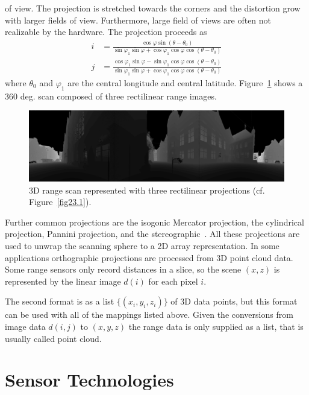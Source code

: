 \documentclass[twocolumn,oneside]{book}
\begin{document}
of view. The projection is stretched towards the corners and the
distortion grow with larger fields of view. Furthermore, large field
of views are often not realizable by the hardware. The projection
proceeds as
\begin{align*}
i &= \frac{\cos \varphi \sin \left( \theta - \theta_0 \right)}{\sin \varphi_1 \sin \varphi + \cos \varphi_1 
\cos \varphi \cos \left(\theta - \theta_0  \right)}
\\
j &= \frac{\cos \varphi_1 \sin \varphi - \sin \varphi_1 \cos \varphi  \cos \left(\theta - \theta_0 \right)}
{\sin \varphi_1 \sin \varphi + \cos \varphi_1\cos \varphi \cos \left(\theta - \theta_0  \right)}
\end{align*}
where $\theta_0$ and $\varphi_1$ are the central longitude and central
latitude. Figure~\ref{rectilinear} shows a 360 deg. scan composed of
three rectilinear range images.
%
\begin{figure}
  \includegraphics[width=\linewidth]{BOOKFIGS/scan007_RECTILINEAR_depth_1}
  \caption{3D range scan represented with three rectilinear
    projections (cf. Figure~\ref{fig23.1}).}
\label{rectilinear}
\end{figure}

Further common projections are the isogonic Mercator projection, the
cylindrical projection, Pannini projection, and the
stereographic~\cite{Houshiar2013}. All these projections are used to
unwrap the scanning sphere to a 2D array representation. In some
applications orthographic projections are processed from 3D point
cloud data. Some range sensors only record distances in a slice, so
the scene $(x,z)$ is represented by the linear image $d(i)$ for each
pixel $i$.

The second format is as a list $\{(x_i,y_i,z_i)\}$ of 3D data points,
but this format can be used with all of the mappings listed above.
Given the conversions from image data $d(i,j)$ to $(x,y,z)$ the range
data is only supplied as a list, that is usually called point cloud.

\section{Sensor Technologies}
\end{document}
